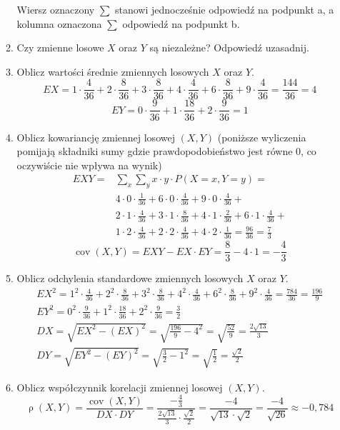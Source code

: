 \documentclass[twoside]{mwart}
\newcommand{\ans}[1]{}
\newenvironment{ansenv}{\comment}{\endcomment}
\newenvironment{ansenv}{\paragraph{Odpowiedź:}}{}
\newcommand{\ans}[1]{\begin{ansenv}#1\end{ansenv}}
\DeclareMathOperator{\cov}{cov}
\DeclareMathOperator{\corr}{\rho}
\begin{document}
\begin{enumerate}
\begin{enumerate}
\begin{ansenv}
		Wiersz oznaczony $\sum$ stanowi jednocześnie odpowiedź na podpunkt a, a kolumna oznaczona $\sum$ odpowiedź na podpunkt b.
	\end{ansenv}
	\item Czy zmienne losowe $X$ oraz $Y$ są niezależne? Odpowiedź uzasadnij.
	\ans{Zmienne są niezależne, bo np. $P(X=1,Y=0)=0\neq P(X=1)\cdot P(Y=0)=\frac{9}{36}\cdot\frac{4}{36}=\frac{1}{36}$}
	\item Oblicz wartości średnie zmiennych losowych $X$ oraz $Y$.
	\begin{ansenv}
		\[
		EX = 1\cdot \frac{4}{36} + 2\cdot\frac{8}{36} + 3\cdot\frac{8}{36} + 4\cdot\frac{4}{36} + 6\cdot\frac{8}{36} + 9\cdot\frac{4}{36} = \frac{144}{36} = 4
		\]
		\[
		EY = 0\cdot \frac{9}{36} + 1\cdot\frac{18}{36} + 2\cdot\frac{9}{36} = 1
		\]
	\end{ansenv}
	\item Oblicz kowariancję zmiennej losowej $(X,Y)$ (poniższe wyliczenia pomijają składniki sumy gdzie prawdopodobieństwo jest równe 0, co oczywiście nie wpływa na wynik)
	\begin{ansenv}
		\begin{align*}
		EXY = & \sum_x\sum_y x\cdot y\cdot P(X=x, Y=y) = \\ & 4\cdot 0\cdot \frac{1}{36} + 6\cdot 0\cdot \frac{4}{36} + 9\cdot 0\cdot \frac{4}{36} + \\ & 2\cdot 1\cdot \frac{4}{36} + 3\cdot 1\cdot \frac{8}{36} + 4\cdot 1\cdot \frac{2}{36} + 6\cdot 1\cdot \frac{4}{36} + \\ & 1\cdot 2\cdot \frac{4}{36} + 2\cdot 2\cdot \frac{4}{36} + 4\cdot 2\cdot \frac{1}{36} = \frac{96}{36} = \frac{7}{3}
		\end{align*}
		\[ \cov(X,Y)=EXY-EX\cdot EY = \frac{8}{3} - 4\cdot 1 = -\frac{4}{3} \]
	\end{ansenv}
	\item Oblicz odchylenia standardowe zmiennych losowych $X$ oraz $Y$.
	\begin{ansenv}
		\begin{gather*}
		EX^2 = 1^2\cdot \frac{4}{36} + 2^2\cdot\frac{8}{36} + 3^2\cdot\frac{8}{36} + 4^2\cdot\frac{4}{36} + 6^2\cdot\frac{8}{36} + 9^2\cdot\frac{4}{36} = \frac{784}{36} = \frac{196}{9} \\
		EY^2 = 0^2\cdot \frac{9}{36} + 1^2\cdot\frac{18}{36} + 2^2\cdot\frac{9}{36} = \frac{3}{2} \\
		DX = \sqrt{EX^2 - (EX)^2} = \sqrt{\frac{196}{9} - 4^2} = \sqrt{\frac{52}{9}} = \frac{2\sqrt{13}}{3} \\
		DY = \sqrt{EY^2- (EY)^2} = \sqrt{\frac{3}{2}-1^2} = \sqrt{\frac{1}{2}} = \frac{\sqrt{2}}{2}
		\end{gather*}
	\end{ansenv}
	\item Oblicz współczynnik korelacji zmiennej losowej $(X,Y)$.
	\begin{ansenv}
		\[\corr(X,Y)=\frac{\cov(X,Y)}{DX\cdot DY} = \frac{-\frac{4}{3}}{\frac{2\sqrt{13}}{3}\cdot \frac{\sqrt{2}}{2}} =
		\frac{-4}{\sqrt{13}\cdot\sqrt{2}} = \frac{-4}{\sqrt{26}} \approx -0{,}784 \]
	\end{ansenv}
\end{enumerate}


\end{enumerate}
\end{document}
